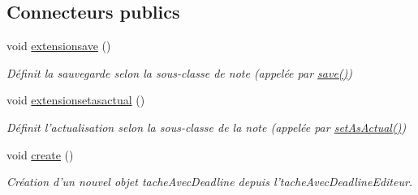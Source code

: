 \subsection*{Connecteurs publics}
\begin{DoxyCompactItemize}
\item 
\hypertarget{class_tache_avec_deadline_editeur_adba63da747f669eb68f1933fb0c442b2}{void \hyperlink{class_tache_avec_deadline_editeur_adba63da747f669eb68f1933fb0c442b2}{extensionsave} ()}\label{class_tache_avec_deadline_editeur_adba63da747f669eb68f1933fb0c442b2}

\begin{DoxyCompactList}\small\item\em Définit la sauvegarde selon la sous-\/classe de note (appelée par \hyperlink{class_note_editeur_a605b1bca885c25460cb7d8863d1f3d03}{save()}) \end{DoxyCompactList}\item 
\hypertarget{class_tache_avec_deadline_editeur_a65604ab58431d7c791e6b39ea005a5ab}{void \hyperlink{class_tache_avec_deadline_editeur_a65604ab58431d7c791e6b39ea005a5ab}{extensionsetasactual} ()}\label{class_tache_avec_deadline_editeur_a65604ab58431d7c791e6b39ea005a5ab}

\begin{DoxyCompactList}\small\item\em Définit l'actualisation selon la sous-\/classe de la note (appelée par \hyperlink{class_note_editeur_a857f285628a0b7dcb6a69b18c977aa71}{set\-As\-Actual()}) \end{DoxyCompactList}\item 
\hypertarget{class_tache_avec_deadline_editeur_a4a72b30f20d2059f38ba72376e94437e}{void \hyperlink{class_tache_avec_deadline_editeur_a4a72b30f20d2059f38ba72376e94437e}{create} ()}\label{class_tache_avec_deadline_editeur_a4a72b30f20d2059f38ba72376e94437e}

\begin{DoxyCompactList}\small\item\em Création d'un nouvel objet tache\-Avec\-Deadline depuis l'tache\-Avec\-Deadline\-Editeur. \end{DoxyCompactList}\end{DoxyCompactItemize}
